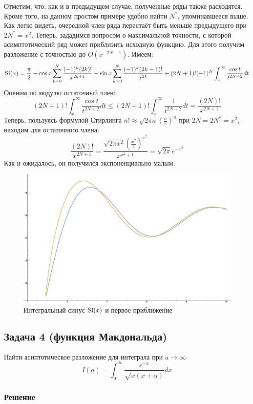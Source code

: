 \documentclass[a4paper,12pt]{article}
\begin{document}
\noindent
Отметим, что, как и в предыдущем случае, полученные ряды также расходятся. Кроме того, на данном простом примере удобно найти $N^{*}$, упоминавшееся выше. Как легко видеть, очередной член ряда перестаёт быть меньше предыдущего при $2N^{*}=x^2$. Теперь, зададимся вопросом о максимальной точности, с которой асимптотический ряд может приблизить исходную функцию. Для этого получим разложение с точностью до $\underline{O}\left(x^{-2N-1}\right)$. Имеем:
\[
{\rm Si}(x)=\frac{\pi}{2}-\cos x\sum_{k=0}^{N}\frac{(-1)^{k}(2k)!}{x^{2k+1}}-\sin x\sum_{k=0}^{N}\frac{(-1)^{k}(2k-1)!}{x^{2k}}+(2N+1)!(-1)^N\int_x^{\infty}\frac{\cos t}{t^{2N+2}}dt
\]
Оценим по модулю остаточный член:
\[
(2N+1)!\int_x^{\infty}\frac{\cos t}{t^{2N+2}}dt\le(2N+1)!\int_x^{\infty}\frac{1}{t^{2N+2}}dt=\frac{(2N)!}{x^{2N+1}}
\]
Теперь, пользуясь формулой Стирлинга $n!\approx\sqrt{2\pi n}\left(\frac{n}{e}\right)^n$ при $2N=2N^{*}=x^2$, находим для остаточного члена:
\[
\frac{(2N)!}{x^{2N+1}}=\frac{\sqrt{2\pi x^2}\left(\frac{x^2}{e}\right)^{x^2}}{x^{x^2+1}}=\sqrt{2\pi} e^{-x^2}
\]
Как и ожидалось, он получился экспоненциально малым.
\begin{figure}[h]
\caption{Интегральный синус ${\rm Si}(x)$ и первое приближение}
\centering
\includegraphics[width=0.65\columnwidth]{sinintegral.eps}
\end{figure}

\subsection*{Задача 4 (функция Макдональда)}

Найти асиптотическое разложение для интеграла при $a\to\infty$ 
\[
I(a)=\int_{0}^{\infty}\frac{e^{-x}}{\sqrt{x(x+\alpha)}}dx
\]



\subsubsection*{Решение}
\end{document}
